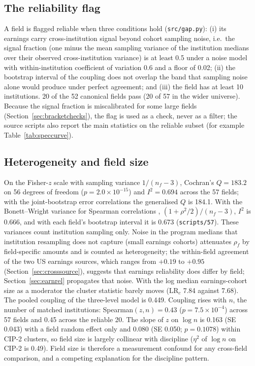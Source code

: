 \documentclass[11pt]{article}
\newcommand{\scr}[1]{\texttt{scripts/#1}}
\begin{document}
\subsection{The reliability flag}\label{sec:flag}

A field is flagged reliable when three conditions hold (\texttt{src/gap.py}): (i) its earnings carry
cross-institution signal beyond cohort sampling noise, i.e.\ the signal fraction (one minus the mean sampling
variance of the institution medians over their observed cross-institution variance) is at least 0.5 under a
noise model with within-institution coefficient of variation 0.6 and a floor of 0.02; (ii) the bootstrap
interval of the coupling does not overlap the band that sampling noise alone would produce under perfect
agreement; and (iii) the field has at least 10 institutions. 20 of the 52 canonical fields pass (20 of 57 in the
wider universe). Because the signal fraction is miscalibrated for some large fields (Section~\ref{sec:bracketchecks}),
the flag is used as a check, never as a filter; the source scripts also report the main statistics on the
reliable subset (for example Table~\ref{tab:speccurve}).

\subsection{Heterogeneity and field size}\label{sec:hetero}

On the Fisher-$z$ scale with sampling variance $1/(n_f-3)$, Cochran's $Q=183.2$ on 56 degrees of freedom
($p=2.0\times10^{-15}$) and $I^2=0.694$ across the 57 fields; with the joint-bootstrap error correlations the
generalised $Q$ is 184.1. With the Bonett--Wright variance for Spearman correlations \citep{bonett2000sample}, $(1+\rho^2/2)/(n_f-3)$,
$I^2$ is 0.666, and with each field's bootstrap interval it is 0.673 (\scr{57}). These variances count
institution sampling only. Noise in the program medians that institution resampling does not capture (small
earnings cohorts) attenuates $\rho_f$ by field-specific amounts and is counted as heterogeneity; the
within-field agreement of the two US earnings sources, which ranges from $+0.19$ to $+0.95$
(Section~\ref{sec:crosssource}), suggests that earnings reliability does differ by field;
Section~\ref{sec:earnrel} propagates that noise. With the log median earnings-cohort size as a moderator the
cluster statistic barely moves ($\text{LR}_c$ 7.84 against 7.68). The
pooled coupling of the three-level model is 0.449. Coupling rises with $n$, the
number of matched institutions: Spearman$(z,n)=0.43$ ($p=7.5\times10^{-4}$) across 57 fields and 0.45 across the
reliable 20. The slope of $z$ on $\log n$ is 0.163 (SE 0.043) with a field random effect only and 0.080 (SE
0.050; $p=0.1078$) within CIP-2 clusters, so field size is largely collinear with discipline ($\eta^2$ of
$\log n$ on CIP-2 is 0.49). Field size is therefore a measurement confound for any cross-field comparison, and
a competing explanation for the discipline pattern.
\end{document}
